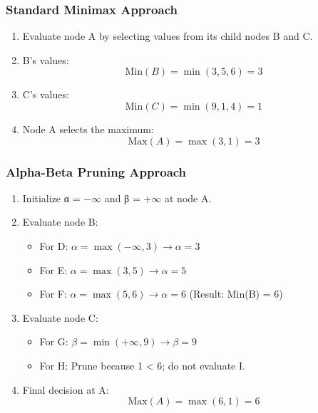 \documentclass[aspectratio=169]{beamer}
\begin{document}
\begin{frame}[fragile]
    \frametitle{Standard Minimax Approach}
    \begin{enumerate}
        \item Evaluate node A by selecting values from its child nodes B and C.
        \item B's values:
        \begin{equation}
            \text{Min}(B) = \min(3, 5, 6) = 3
        \end{equation}
        \item C's values:
        \begin{equation}
            \text{Min}(C) = \min(9, 1, 4) = 1
        \end{equation}
        \item Node A selects the maximum:
        \begin{equation}
            \text{Max}(A) = \max(3, 1) = 3
        \end{equation}
    \end{enumerate}
\end{frame}

\begin{frame}[fragile]
    \frametitle{Alpha-Beta Pruning Approach}
    \begin{enumerate}
        \item Initialize α = $-\infty$ and β = $+\infty$ at node A.
        \item Evaluate node B:
        \begin{itemize}
            \item For D: $\alpha = \max(-\infty, 3) \rightarrow \alpha = 3$
            \item For E: $\alpha = \max(3, 5) \rightarrow \alpha = 5$
            \item For F: $\alpha = \max(5, 6) \rightarrow \alpha = 6$ (Result: Min(B) = 6)
        \end{itemize}
        \item Evaluate node C:
        \begin{itemize}
            \item For G: $\beta = \min(+\infty, 9) \rightarrow \beta = 9$
            \item For H: Prune because 1 < 6; do not evaluate I.
        \end{itemize}
        \item Final decision at A:
        \begin{equation}
            \text{Max}(A) = \max(6, 1) = 6
        \end{equation}
    \end{enumerate}
\end{frame}
\end{document}
